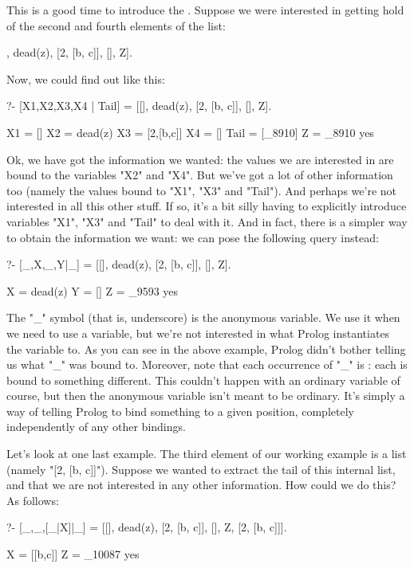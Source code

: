 This is a good time to introduce the .
Suppose we were interested in getting hold of the second and fourth
elements of the list:
\begin{LPNcodedisplay}
[[], dead(z), [2, [b, c]], [], Z].
\end{LPNcodedisplay}

Now, we could find out like this:
\begin{LPNcodedisplay}
?- [X1,X2,X3,X4 | Tail] =
            [[], dead(z), [2, [b, c]], [], Z].

X1 = []
X2 = dead(z)
X3 = [2,[b,c]]
X4 = []
Tail = [_8910]
Z = _8910
yes
\end{LPNcodedisplay}

Ok, we have got the information we wanted: the values we are
interested in are bound to the variables "X2" and "X4".  But
we've got a lot of other information too (namely the values bound to
"X1", "X3" and "Tail"). And perhaps we're not
interested in all this other stuff. If so, it's a bit silly having to
explicitly introduce variables "X1", "X3" and "Tail" to
deal with it.  And in fact, there is a simpler way to obtain 
the information we want: we can pose the following query
instead:


\begin{LPNcodedisplay}
?- [_,X,_,Y|_] = [[], dead(z), [2, [b, c]], [], Z].

X = dead(z)
Y = []
Z = _9593
yes
\end{LPNcodedisplay}


The "_" symbol (that is, underscore) is the anonymous variable.  We
use it when we need to use a variable, but we're not interested in
what Prolog instantiates the variable to.  As you can see in the above
example, Prolog didn't bother telling us what "_" was bound to.
Moreover, note that each occurrence of "_" is :
each is bound to something different. This couldn't happen with an
ordinary variable of course, but then the anonymous variable isn't
meant to be ordinary. It's simply a way of telling Prolog to bind
something to a given position, completely independently of any other
bindings.

Let's look at one last example. The third element of our working
example is a list (namely "[2, [b, c]]").  Suppose we
wanted to extract the tail of this internal list, and that we are not
interested in any other information.  How could we do this?  As
follows:

\begin{LPNcodedisplay}
?- [_,_,[_|X]|_] =
      [[], dead(z), [2, [b, c]], [], Z, [2, [b, c]]].

X = [[b,c]]
Z = _10087
yes
\end{LPNcodedisplay}




